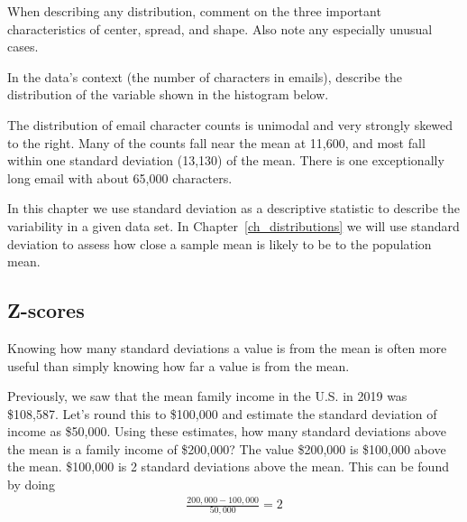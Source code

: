 When describing any distribution, comment on the three important characteristics of center, spread, and shape. Also note any especially unusual cases.


\begin{examplewrap}
\begin{nexample}{In the data's context (the number of characters in emails), describe the distribution of the  variable shown in the histogram below.
  \begin{center}
  \end{center}}
The distribution of email character counts is unimodal and very strongly skewed to the right. Many of the counts fall near the mean at 11,600, and most fall within one standard deviation (13,130) of the mean. There is one exceptionally long email with about 65,000 characters.



\end{nexample}
\end{examplewrap}

In this chapter we use standard deviation as a descriptive statistic to describe the variability in a given data set. In Chapter~\ref{ch_distributions} we will use standard deviation to assess how close a sample mean is likely to be to the population mean.


\D{\newpage}

\subsection{Z-scores}
\label{zscores}


Knowing how many standard deviations a value is from the mean is often more useful than simply knowing how far a value is from the mean.

\begin{examplewrap}
\begin{nexample}
{Previously, we saw that the mean family income in the U.S. in 2019 was \$108,587. Let's round this to \$100,000 and estimate the standard deviation of income as \$50,000.  Using these estimates, how many standard deviations above the mean is a family income of \$200,000?  }
The value \$200,000 is \$100,000 above the mean.  \$100,000 is 2 standard deviations above the mean.  This can be found by doing
  \begin{align*}
  \frac{200,000 - 100,000}{50,000} = 2
  \end{align*}
\end{nexample}
\end{examplewrap}

